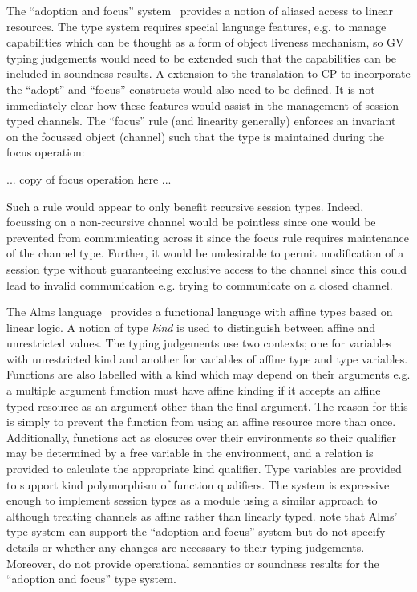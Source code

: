 \documentclass{mprop}
\newcommand{\1}{\textbf{1}\xspace}
\begin{document}
The ``adoption and focus'' system~\cite{Fahndrich:2002} provides a notion of
aliased access to linear resources. The type system requires special language
features, e.g. to manage capabilities which can be thought as a form of object
liveness mechanism, so GV typing judgements would need to be extended such
that the capabilities can be included in soundness results. A extension to the
translation to CP to incorporate the ``adopt'' and ``focus'' constructs would
also need to be defined. It is not immediately clear how these features would
assist in the management of session typed channels. The ``focus'' rule (and
linearity generally) enforces an invariant on the focussed object (channel)
such that the type is maintained during the focus operation:

... copy of focus operation here ...

Such a rule would appear to only benefit recursive session types. Indeed,
focussing on a non-recursive channel would be pointless since one would be
prevented from communicating across it since the focus rule requires
maintenance of the channel type. Further, it would be undesirable to permit
modification of a session type without guaranteeing exclusive access to the
channel since this could lead to invalid communication e.g. trying to
communicate on a closed channel.

The Alms language~\cite{Aldrich:2009} provides a functional language with
affine types based on linear logic. A notion of type \textit{kind} is used to
distinguish between affine and unrestricted values. The typing judgements use
two contexts; one for variables with unrestricted kind and another for
variables of affine type and type variables. Functions are also labelled with
a kind which may depend on their arguments e.g. a multiple argument function
must have affine kinding if it accepts an affine typed resource as an argument
other than the final argument. The reason for this is simply to prevent the
function from using an affine resource more than once. Additionally, functions
act as closures over their environments so their qualifier may be determined
by a free variable in the environment, and a relation is provided to calculate
the appropriate kind qualifier. Type variables are provided to support kind
polymorphism of function qualifiers. The system is expressive enough to
implement session types as a module using a similar approach to
\citeauthor{Gay:2010:LAST}~\cite{Gay:2010:LAST} although treating channels as
affine rather than linearly typed. \citeauthor{Aldrich:2009} note that Alms'
type system can support the ``adoption and focus'' system but do not specify
details or whether any changes are necessary to their typing
judgements. Moreover, \citeauthor{Fahndrich:2002} do not provide operational
semantics or soundness results for the ``adoption and focus'' type system.
\end{document}
